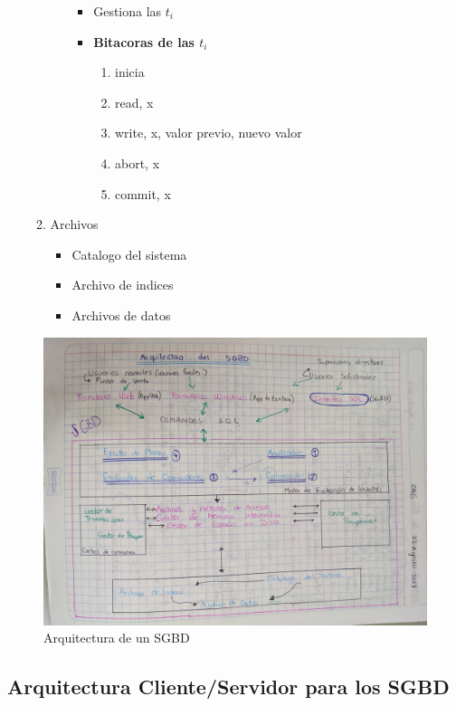 \documentclass[twoside]{article}
\begin{document}
\begin{enumerate}
\begin{enumerate}
\begin{itemize}
\begin{itemize}
      \item Gestiona las $t_i$
      \item \textbf{Bitacoras de las $t_i$}
      \begin{enumerate}
        \item inicia
        \item read, x
        \item write, x, valor previo, nuevo valor
        \item abort, x
        \item commit, x
      \end{enumerate}
    \end{itemize}
    \end{itemize}
    \item Archivos
    \begin{itemize}
      \item Catalogo del sistema
      \item Archivo de indices
      \item Archivos de datos
    \end{itemize}
  \end{enumerate}
\end{enumerate}

\begin{figure}[htb]
  \includegraphics[width=1\linewidth]{arqsgbd.jpg}
  \caption{Arquitectura de un SGBD}
\end{figure}

\clearpage


\subsection{Arquitectura Cliente/Servidor para los SGBD}
\end{document}
